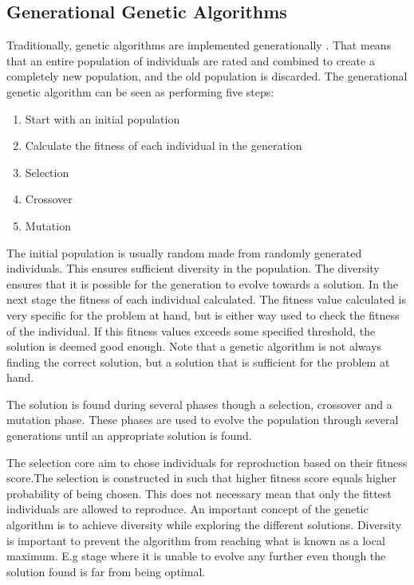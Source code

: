 
\subsection{Generational Genetic Algorithms}

Traditionally, genetic algorithms are implemented generationally . That means that an entire population of individuals are rated and combined to create a completely new population, and the old population is discarded. The generational genetic algorithm can be seen as performing five steps:


\begin{enumerate}
    \item Start with an initial population
    \item Calculate the fitness of each individual in the generation
    \item Selection
    \item Crossover
    \item Mutation  
\end{enumerate}

The initial population is usually random made from randomly generated individuals. This ensures sufficient diversity in the population. The diversity ensures that it is possible for the generation to evolve towards a solution. In the next stage the fitness of each individual calculated. The fitness value calculated is very specific for the problem at hand, but is either way used to check the fitness of the individual. If this fitness values exceeds some specified threshold, the solution is deemed good enough. Note that a genetic algorithm is not always finding the correct solution, but a solution that is sufficient for the problem at hand.

The solution is found during several phases though a selection, crossover and a mutation phase. 
These phases are used to evolve the population through several generations until an appropriate 
solution is found. 

The selection core aim to chose individuals for reproduction based on their fitness score.The selection is constructed in such that higher fitness score equals higher probability of being chosen. This does not necessary mean that only the fittest individuals are allowed to reproduce. An important concept of the genetic algorithm is to achieve diversity while exploring the different solutions. Diversity is important to prevent the algorithm from reaching what is known as a local maximum. E.g stage where it is unable to evolve any further even though the solution found is far from being optimal.

